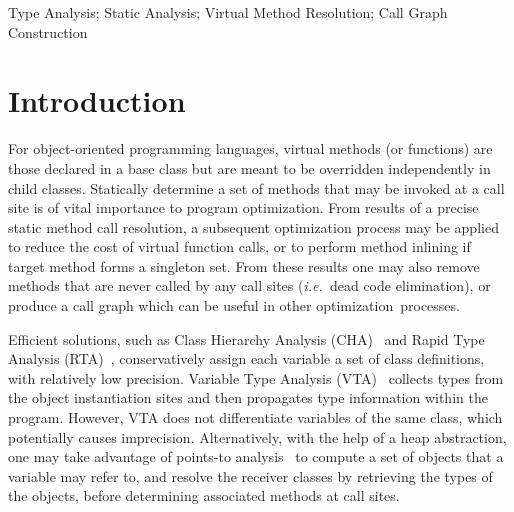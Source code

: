 \documentclass{fac}
\newcommand\ie{\textit{i.e.\ }}
\begin{document}
\begin{keywords}
Type Analysis; Static Analysis; Virtual Method Resolution; Call Graph Construction
\end{keywords}

\section{Introduction}\label{sec:introduction}
For object-oriented programming languages, virtual methods (or functions) are those declared in a base class but are meant to be overridden independently in child classes. Statically determine a set of methods that may be invoked at a call site is of vital importance to program optimization. From results of a precise static method call resolution, a subsequent optimization process may be applied to reduce the cost of virtual function calls, or to perform method inlining if target method forms a singleton set. From these results one may also remove methods that are never called by any call sites (\ie dead code elimination), or produce a call graph which can be useful in other optimization~processes.

Efficient solutions, such as Class Hierarchy Analysis (CHA)~\cite{Dean1995,Fernandez1995} and Rapid Type Analysis (RTA)~\cite{Bacon1996}, conservatively assign each variable a set of class definitions, with relatively low precision. Variable Type Analysis (VTA)~\cite{Sundaresan2000} collects types from the object instantiation sites and then propagates type information within the program. However, VTA does not differentiate variables of the same class, which potentially causes imprecision. Alternatively, with the help of a heap abstraction, one may take advantage of points-to analysis~\cite{andersen94} to compute a set of objects that a variable may refer to, and resolve the receiver classes by retrieving the types of the objects, before determining associated methods at call sites.
\end{document}
